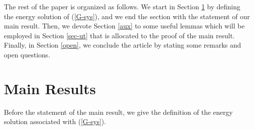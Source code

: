 \documentclass[12pt,leqno]{amsart}
\numberwithin{equation}{section}
\theoremstyle{remark}
\begin{document}
The  rest of the paper is organized as follows. We start in Section \ref{sec-main} by defining  the energy solution of (\ref{G-sys}), and  we end the section with the statement of our main result.  Then, we devote Section \ref{aux} to some useful lemmas which will be employed in Section \ref{sec-ut} that is allocated to the proof of the main result. Finally, in Section \ref{open}, we conclude  the article by stating some remarks and open questions.






\section{Main Results}\label{sec-main}
\par

Before the statement of the main result,  we give the definition of  the energy solution associated with (\ref{G-sys}).
\end{document}
